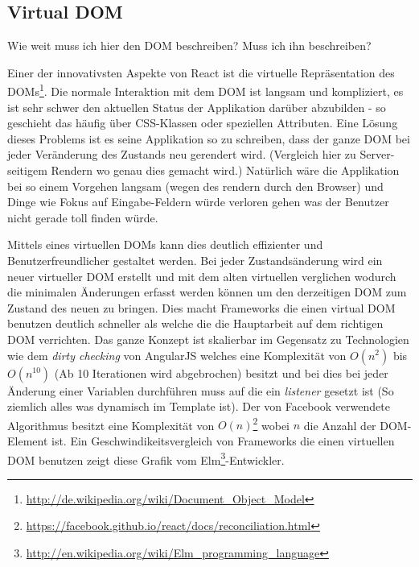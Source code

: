 \documentclass[12pt,twoside]{book}
\begin{document}
\subsection*{Virtual DOM}

Wie weit muss ich hier den DOM beschreiben? Muss ich ihn beschreiben?

Einer der innovativsten Aspekte von React ist die virtuelle Repräsentation des DOMs\footnote{\url{http://de.wikipedia.org/wiki/Document_Object_Model}}. Die normale Interaktion mit dem DOM ist langsam und kompliziert, es ist sehr schwer den aktuellen Status der Applikation darüber abzubilden - so geschieht das häufig über CSS-Klassen oder speziellen Attributen.
Eine Lösung dieses Problems ist es seine Applikation so zu schreiben, dass der ganze DOM bei jeder Veränderung des Zustands neu gerendert wird. (Vergleich hier zu Server-seitigem Rendern wo genau dies gemacht wird.) Natürlich wäre die Applikation bei so einem Vorgehen langsam (wegen des rendern durch den Browser) und Dinge wie Fokus auf Eingabe-Feldern würde verloren gehen was der Benutzer nicht gerade toll finden würde.

Mittels eines virtuellen DOMs kann dies deutlich effizienter und Benutzerfreundlicher gestaltet werden. Bei jeder Zustandsänderung wird ein neuer virtueller DOM erstellt und mit dem alten virtuellen verglichen wodurch die minimalen Änderungen erfasst werden können um den derzeitigen DOM zum Zustand des neuen zu bringen. Dies macht Frameworks die einen virtual DOM benutzen deutlich schneller als welche die die Hauptarbeit auf dem richtigen DOM verrichten. Das ganze Konzept ist skalierbar im Gegensatz zu Technologien wie dem \textit{dirty checking} von AngularJS welches eine Komplexität von $O(n^2)$ bis $O(n^10)$ (Ab 10 Iterationen wird abgebrochen) besitzt und bei dies bei jeder Änderung einer Variablen durchführen muss auf die ein \textit{listener} gesetzt ist (So ziemlich alles was dynamisch im Template ist).
Der von Facebook verwendete Algorithmus besitzt eine Komplexität von $O(n)$\footnote{\url{https://facebook.github.io/react/docs/reconciliation.html}} wobei $n$ die Anzahl der DOM-Element ist.
Ein Geschwindikeitsvergleich von Frameworks die einen virtuellen DOM benutzen zeigt diese Grafik vom Elm\footnote{\url{http://en.wikipedia.org/wiki/Elm_programming_language}}-Entwickler.
\end{document}
